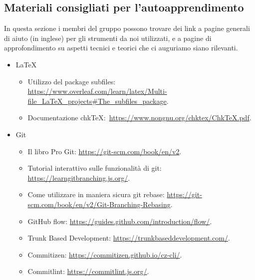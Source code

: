 \documentclass[../norme-di-progetto.tex]{subfiles}
\begin{document}
\subsection{Materiali consigliati per l'autoapprendimento}%
\label{sub:materiali_consigliati_per_l_autoapprendimento}

In questa sezione i membri del gruppo possono trovare dei link a pagine generali di aiuto (in inglese) per gli strumenti da noi utilizzati, e a pagine di approfondimento su aspetti tecnici e teorici che ci auguriamo siano rilevanti.

\begin{itemize}
  \item \LaTeX{}
        \begin{itemize}
          \item Utilizzo del package subfiles: \href{https://www.overleaf.com/learn/latex/Multi-file_LaTeX_projects#The_subfiles_package}{https://www.overleaf.com/learn/latex/Multi-file\_LaTeX\_projects\#The\_subfiles\_package}.
          \item Documentazione chk\TeX:\ \href{https://www.nongnu.org/chktex/ChkTeX.pdf}{https://www.nongnu.org/chktex/ChkTeX.pdf}.
        \end{itemize}

  \item Git
        \begin{itemize}
          \item Il libro Pro Git: \href{https://git-scm.com/book/en/v2}{https://git-scm.com/book/en/v2}.
          \item Tutorial interattivo sulle funzionalità di git: \href{https://learngitbranching.js.org/}{https://learngitbranching.js.org/}.
          \item Come utilizzare in maniera sicura git rebase: \href{https://git-scm.com/book/en/v2/Git-Branching-Rebasing}{https://git-scm.com/book/en/v2/Git-Branching-Rebasing}.
          \item GitHub flow: \href{https://guides.github.com/introduction/flow/}{https://guides.github.com/introduction/flow/}.
          \item Trunk Based Development: \href{https://trunkbaseddevelopment.com/}{https://trunkbaseddevelopment.com/}.
          \item Commitizen: \href{https://commitizen.github.io/cz-cli/}{https://commitizen.github.io/cz-cli/}.
          \item Commitlint: \href{https://commitlint.js.org/}{https://commitlint.js.org/}.
        \end{itemize}


\end{itemize}
\end{document}
